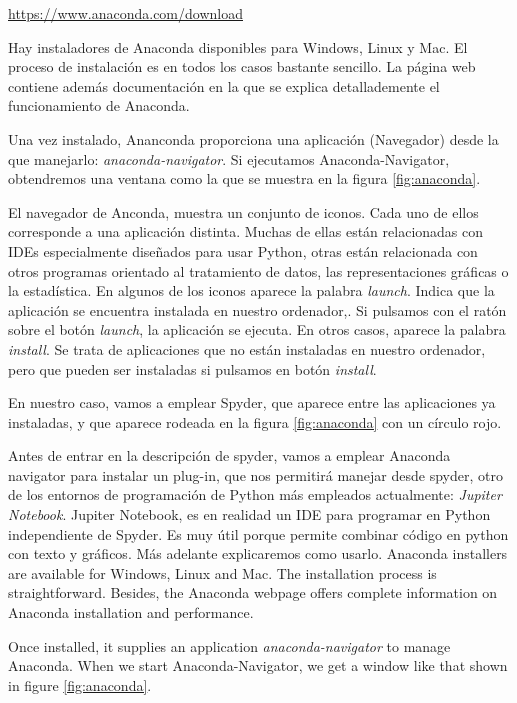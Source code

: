 \begin{center}
    \hyperlink{https://www.anaconda.com/download}{https://www.anaconda.com/download}
\end{center} 
\begin{paracol}{2}
 Hay instaladores de Anaconda disponibles para Windows, Linux y Mac. El proceso de instalación es en todos los casos bastante sencillo. La página web contiene además documentación en la que se explica detallademente el funcionamiento de Anaconda.

 Una vez instalado, Ananconda proporciona una aplicación (Navegador) desde la que manejarlo: \emph{anaconda-navigator}. Si ejecutamos Anaconda-Navigator, obtendremos una ventana como la que se muestra en la figura \ref{fig:anaconda}.

 El navegador de Anconda, muestra un conjunto de iconos. Cada uno de ellos corresponde a una aplicación distinta. Muchas de ellas están relacionadas con IDEs especialmente diseñados para usar Python, otras están relacionada con otros programas orientado al tratamiento de datos, las representaciones gráficas o la estadística. En algunos de los iconos aparece la palabra \emph{launch}. Indica que la aplicación se encuentra instalada en nuestro ordenador,. Si pulsamos con el ratón sobre el botón \emph{launch}, la aplicación se ejecuta. En otros casos, aparece la palabra \emph{install}. Se trata de aplicaciones que no están instaladas en nuestro ordenador, pero que pueden ser instaladas si pulsamos en botón \emph{install}. 

 En nuestro caso, vamos a emplear Spyder, que aparece entre las aplicaciones ya instaladas, y que aparece rodeada en la figura \ref{fig:anaconda} con un círculo rojo.

 Antes de entrar en la descripción de spyder, vamos a emplear Anaconda navigator para instalar un plug-in, que nos permitirá manejar desde spyder, otro de los entornos de programación de Python más empleados actualmente: \emph{Jupiter Notebook}. Jupiter Notebook, es en realidad un IDE para programar en Python independiente de Spyder. Es muy útil porque permite combinar código en python con texto y gráficos. Más adelante explicaremos como usarlo.  
 \switchcolumn
 Anaconda installers are available for Windows, Linux and Mac. The installation process is straightforward. Besides, the Anaconda webpage offers complete information on Anaconda installation and performance.

 Once installed, it supplies an application \emph{anaconda-navigator} to manage Anaconda. When we start Anaconda-Navigator, we get a window like that shown in figure \ref{fig:anaconda}.


\end{paracol}
